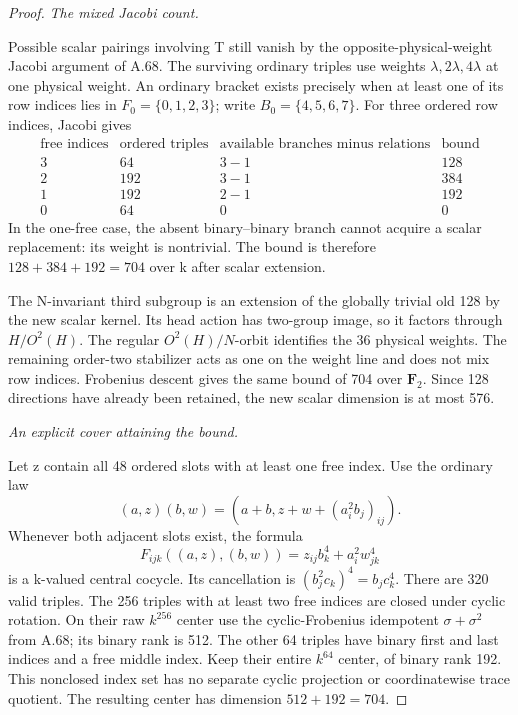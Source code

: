 \begin{proof}
\emph{The mixed Jacobi count.}\par
Possible scalar pairings involving T still vanish by the
opposite-physical-weight Jacobi argument of A.68. The surviving
ordinary triples use weights \(\lambda,2\lambda,4\lambda\) at one
physical weight. An ordinary bracket exists precisely when at least
one of its row indices lies in \(F_0=\{0,1,2,3\}\); write
\(B_0=\{4,5,6,7\}\). For three ordered row indices, Jacobi gives
\[
\begin{array}{c|c|c|c}
 \text{free indices}&\text{ordered triples}&
 \text{available branches minus relations}&\text{bound}\\ \hline
 3&64&3-1&128\\
 2&192&3-1&384\\
 1&192&2-1&192\\
 0&64&0&0
\end{array}
 \tag{A.73.3}
\]
In the one-free case, the absent binary--binary branch cannot acquire
a scalar replacement: its weight is nontrivial. The bound is therefore
\(128+384+192=704\) over k after scalar extension.

The N-invariant third subgroup is an extension of the globally trivial
old 128 by the new scalar kernel. Its head action has two-group image,
so it factors through \(H/O^2(H)\). The regular
\(O^2(H)/N\)-orbit identifies the 36 physical weights. The remaining
order-two stabilizer acts as one on the weight line and does not mix
row indices. Frobenius descent gives the same bound of 704 over
\(\mathbf F_2\). Since 128 directions have already been retained,
the new scalar dimension is at most 576.

\emph{An explicit cover attaining the bound.}\par
Let z contain all 48 ordered slots with at least one free index.
Use the ordinary law
\[
 (a,z)(b,w)=(a+b,z+w+(a_i^2b_j)_{ij}).
\]
Whenever both adjacent slots exist, the formula
\[
 F_{ijk}((a,z),(b,w))=z_{ij}b_k^4+a_i^2w_{jk}^4
 \tag{A.73.4}
\]
is a k-valued central cocycle. Its cancellation is
\((b_j^2c_k)^4=b_jc_k^4\). There are 320 valid triples.
The 256 triples with at least two free indices are closed under
cyclic rotation. On their raw \(k^{256}\) center use the
cyclic-Frobenius idempotent \(\sigma+\sigma^2\) from A.68; its
binary rank is 512. The other 64 triples have binary first and last
indices and a free middle index. Keep their entire \(k^{64}\)
center, of binary rank 192. This nonclosed index set has no separate
cyclic projection or coordinatewise trace quotient. The resulting
center has dimension \(512+192=704\).


\end{proof}
